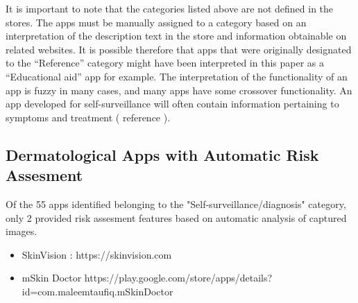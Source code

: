 It is important to note that the categories listed above are not defined in the stores. The apps must be manually assigned to a category based on an interpretation of the description text in the store and information obtainable on related websites. It is possible therefore that apps that were originally designated to the “Reference” category might have been interpreted in this paper as a “Educational aid” app for example. The interpretation of the functionality of an app is fuzzy in many cases, and many apps have some crossover functionality. An app developed for self-surveillance will often contain information pertaining to symptoms and treatment ( reference ).

\subsection{Dermatological Apps with Automatic Risk Assesment}

Of the 55 apps identified belonging to the "Self-surveillance/diagnosis" category, only 2 provided risk assesment features based on automatic analysis of captured images.

\noindent
\begin{itemize}
\item SkinVision : https://skinvision.com
\item mSkin Doctor
https://play.google.com/store/apps/details?id=com.maleemtaufiq.mSkinDoctor
\end{itemize}
